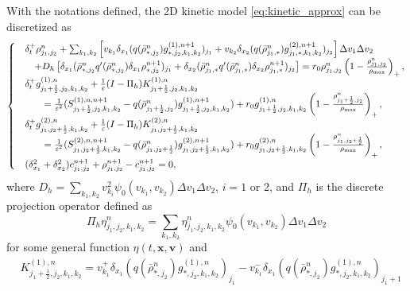 \documentclass{article}
\begin{document}
{With the notations defined, the 2D kinetic model \eqref{eq:kinetic_approx} can be discretized as 
\begin{align}
\label{eq:scheme_2D}
    \begin{cases}
    & \delta_t^+ \rho_{j_1,j_2}^n +  
    \sum_{k_1,k_2} \left[v_{k_1}\delta_{x_1}(q( {\bar{\rho}}_{*,j_2}^n) g_{*,j_2,k_1,k_2}^{(1), n+1})_{j_1} +  v_{k_2}\delta_{x_2}(q( {\bar{\rho}}_{j_1,*}^n) g_{j_1,*,k_1,k_2}^{(2), n+1})_{j_2}\right]\Delta v_1 \Delta v_2\\
     & \quad + D_h \left[ \delta_{x_1}( {\bar{\rho}}_{*,j_2}^n q'( {\bar{\rho}}_{*,j_2}^n)\delta_{x_1} \rho_{*,j_2}^{n+1})_{j_1} + \delta_{x_2}( {\bar{\rho}}_{j_1,*}^n q'( {\bar{\rho}}_{j_1,*}^n)\delta_{x_2} \rho_{j_1,*}^{n+1})_{j_2} \right]
    = r_0 \rho_{j_1,j_2}^{n}\left(1 - \frac{\rho_{j_1,j_2}^n}{\rho_{\rm max}}\right)_+,\\
    &\delta_t^+ g_{j_1+\frac12,j_2,k_1, k_2}^{(1),n} + \frac{1}{\varepsilon}(I-\Pi_h) K_{j_1+\frac12,j_2,k_1, k_2}^{(1),n} \\
    &\qquad = \frac{1}{\varepsilon^2}(S_{j_1+\frac12,j_2,k_1,k_2}^{(1), n, n+1} - q( {\bar{\rho}}_{j_1+\frac12,j_2}^n) g_{j_1+\frac12,j_2,k_1,k_2}^{(1), n+1}) + r_0 g_{j_1+\frac12,j_2,k_1,k_2}^{(1),n}\left(1 - \frac{\rho_{j_1+\frac12,j_2}^n}{\rho_{\rm max}}\right)_+,\\
        &\delta_t^+ g_{j_1,j_2+\frac12,k_1, k_2}^{(2),n} + \frac{1}{\varepsilon}(I-\Pi_h) K_{j_1,j_2+\frac12,k_1, k_2}^{(2),n} \\
    & \qquad = \frac{1}{\varepsilon^2}(S_{j_1,j_2+\frac12,k_1,k_2}^{(2), n, n+1} - q( {\bar{\rho}}_{j_1,j_2+\frac12}^n) g_{j_1,j_2+\frac12,k_1,k_2}^{(2), n+1}) + r_0 g_{j_1,j_2+\frac12,k_1,k_2}^{(2),n}\left(1 - \frac{\rho_{j_1,j_2+\frac12}^n}{\rho_{\rm max}}\right)_+,\\
    & (\delta_{x_1}^2 + \delta_{x_2}^2) c_{j_1,j_2}^{n+1} + \rho_{j_1,j_2}^{n+1} - c_{j_1,j_2}^{n+1} = 0,
\end{cases}
\end{align}
where 
{ 
$D_h=\sum_{k_1,k_2} v_{k_i}^2 \psi_{0}(v_{k_1},v_{k_2})\Delta v_1 \Delta v_2$, $i=1$ or 2, and  
}
$\Pi_h$ is the discrete projection operator defined as 
\begin{equation*}
    \Pi_h \eta_{j_1,j_2,k_1,k_2}^n = \sum_{k_1,k_2}\eta_{j_1,j_2,k_1,k_2}^n \psi_{0}(v_{k_1},v_{k_2})\Delta v_1 \Delta v_2
\end{equation*} 
for some general function $\eta(t,\mathbf{x},\mathbf{v})$ and 
\begin{align*}
    & K_{j_1+\frac12,j_2,k_1, k_2}^{(1),n}  = v_{k_1}^+\delta_{x_1}(q( {\bar{\rho}}_{*,j_2}^n) g_{*,j_2,k_1,k_2}^{(1),n})_{j_1} - v_{k_1}^-\delta_{x_1}(q( {\bar{\rho}}_{*,j_2}^n) g_{*,j_2,k_1,k_2}^{(1),n})_{j_1+1}\\

\end{align*}}
\end{document}
